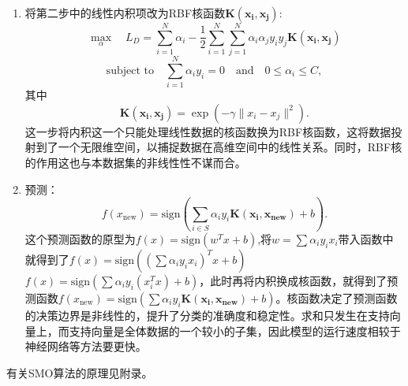 \documentclass[11pt, a4paper]{article}
\begin{document}
\begin{enumerate}
    另一方面，对偶问题是一个最大化系数$\alpha_i$的问题，因为$\frac{1}{2}\sum\sum \alpha_i \alpha_j y_i y_j (x_i^T x_j)$一项实际上就是$\frac{1}{2}\|w\|^2$，实际上还是在惩罚违反条件的点，使得超平面两侧的带状区域间隔最大。这里的约束条件$\sum_{i=1}^N \alpha_i y_i = 0$是一个平衡约束，来自于 $\frac{\partial L_P}{\partial b} = 0$；$0 \le \alpha_i \le C$中$\alpha_i \ge 0$是拉格朗日乘子的基本要求，$\alpha_i \le C$：这是从 $C - \alpha_i - \mu_i = 0$ 和 $\mu_i \ge 0$ 推导出来的。
    \item 将第二步中的线性内积项改为RBF核函数$\mathbf{K(x_i, x_j)}$:$$\max_{\alpha} \quad L_D = \sum_{i=1}^N \alpha_i - \frac{1}{2}\sum_{i=1}^N \sum_{j=1}^N \alpha_i \alpha_j y_i y_j \mathbf{K(x_i, x_j)}$$ $$
    \text{subject to} \quad \sum_{i=1}^N \alpha_i y_i = 0 \quad \text{and} \quad 0 \le \alpha_i \le C,$$其中$$\mathbf{K(x_i, x_j)} = \exp(-\gamma \|x_i - x_j\|^2).$$这一步将内积这一个只能处理线性数据的核函数换为RBF核函数，这将数据投射到了一个无限维空间，以捕捉数据在高维空间中的线性关系。同时，RBF核的作用这也与本数据集的非线性性不谋而合。
    \item 预测：$$f(x_{\text{new}}) = \text{sign}\left( \sum_{i \in S} \alpha_i y_i \mathbf{K(x_i, x_{\text{new}})} + b \right).$$这个预测函数的原型为$f(x) = \text{sign}(w^T x + b)$,将$w = \sum \alpha_i y_i x_i$带入函数中就得到了$f(x) = \text{sign}\left( (\sum \alpha_i y_i x_i)^T x + b \right)$
    $f(x) = \text{sign}\left( \sum \alpha_i y_i (x_i^T x) + b \right)$，此时再将内积换成核函数，就得到了预测函数$f(x_{\text{new}}) = \text{sign}\left( \sum \alpha_i y_i \mathbf{K(x_i, x_{\text{new}})} + b \right)$。核函数决定了预测函数的决策边界是非线性的，提升了分类的准确度和稳定性。求和只发生在支持向量上，而支持向量是全体数据的一个较小的子集，因此模型的运行速度相较于神经网络等方法要更快。
\end{enumerate}
有关SMO算法的原理见附录。
\end{document}
